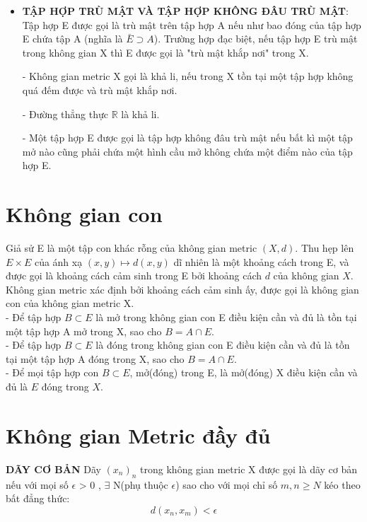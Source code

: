 \documentclass[12pt,a4paper]{article}
\begin{document}
\begin{itemize}
\item{\textbf{TẬP HỢP TRÙ MẬT VÀ TẬP HỢP KHÔNG ĐÂU TRÙ MẬT}: Tập hợp E được gọi là {\color{red}trù mật trên tập hợp A} nếu như bao đóng của tập hợp E chứa tập A (nghĩa là $\bar{E} \supset A$). Trường hợp đạc biệt, nếu tập hợp E trù mật trong không gian X thì E được gọi là "{\color{red}trù mật khắp nơi}" trong X.

- Không gian metric X gọi là {\color{red}khả li}, nếu trong X tồn tại một tập hợp không quá đếm được và trù mật khắp nơi.

- Đường thẳng thực $\mathds{R}$ là {\color{red}khả li}.

- Một tập hợp E được gọi là tập hợp không đâu trù mật nếu bất kì một tập mở nào cũng phải chứa một hình cầu mở không chứa một điểm nào của tập hợp E.}
\end{itemize}
\newpage

\section{Không gian con}

\hspace{0.7cm- }Giả sử E là một tập con khác rỗng của không gian metric $(X,d)$. Thu hẹp lên $E \times E$ của ánh xạ $(x,y) \mapsto d(x,y)$ dĩ nhiên là một khoảng cách trong E, và được gọi là {\color{red}khoảng cách cảm sinh} trong E bởi khoảng cách $d$ của không gian $X$. Không gian metric xác định bởi khoảng cách cảm sinh ấy, được gọi là không gian con của không gian metric X.\\

- Để tập hợp $B \subset E $ là mở trong không gian con E điều kiện cần và đủ là tồn tại một tập hợp A mở trong X, sao cho $B = A\cap E$.\\


- Để tập hợp $B \subset E $ là đóng trong không gian con E điều kiện cần và đủ là tồn tại một tập hợp A đóng trong X, sao cho $B = A\cap E$.\\

- Để mọi tập hợp con $B \subset E $, mở(đóng) trong E, là mở(đóng) X điều kiện cần và đủ là $E$ đóng trong $X$.

\section{Không gian Metric đầy đủ}
    \hspace{0.7cm}\textbf{DÃY CƠ BẢN} Dãy $(x_n)_n$ trong không gian metric X được gọi là {\color{red}dãy cơ bản} nếu với mọi số $\epsilon$ > 0 ,  $\exists$ N(phụ thuộc  $\epsilon$) sao cho với mọi chỉ số $m,n \geqslant N$ kéo theo bất đẳng thức:
    \begin{equation*}
    d(x_n, x_m) < \epsilon
    \end{equation*}
    
\end{document}
